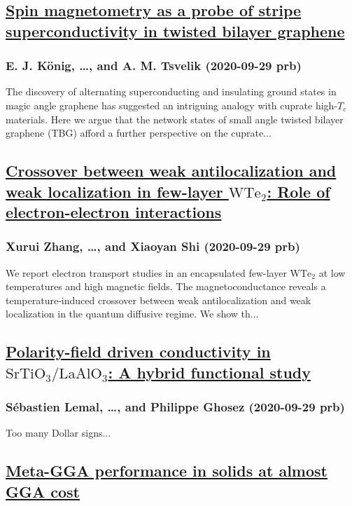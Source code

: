 \subsection*{\href{http://link.aps.org/doi/10.1103/PhysRevB.102.104514}{Spin magnetometry as a probe of stripe superconductivity in twisted bilayer graphene}}
\subsubsection*{E. J. König, \dots, and A. M. Tsvelik (2020-09-29 prb)}
The discovery of alternating superconducting and insulating ground states in magic angle graphene has suggested an intriguing analogy with cuprate high-${T}_{c}$ materials. Here we argue that the network states of small angle twisted bilayer graphene (TBG) afford a further perspective on the cuprate...
\subsection*{\href{http://link.aps.org/doi/10.1103/PhysRevB.102.115161}{Crossover between weak antilocalization and weak localization in few-layer $\mathrm{W}{\mathrm{Te}}_{2}$: Role of electron-electron interactions}}
\subsubsection*{Xurui Zhang, \dots, and Xiaoyan Shi (2020-09-29 prb)}
We report electron transport studies in an encapsulated few-layer $\mathrm{W}{\mathrm{Te}}_{2}$ at low temperatures and high magnetic fields. The magnetoconductance reveals a temperature-induced crossover between weak antilocalization and weak localization in the quantum diffusive regime. We show th...
\subsection*{\href{http://link.aps.org/doi/10.1103/PhysRevB.102.115309}{Polarity-field driven conductivity in ${\mathrm{SrTiO}}_{3}/{\mathrm{LaAlO}}_{3}$: A hybrid functional study}}
\subsubsection*{Sébastien Lemal, \dots, and Philippe Ghosez (2020-09-29 prb)}
Too many Dollar signs...
\subsection*{\href{http://link.aps.org/doi/10.1103/PhysRevB.102.121109}{Meta-GGA performance in solids at almost GGA cost}}
